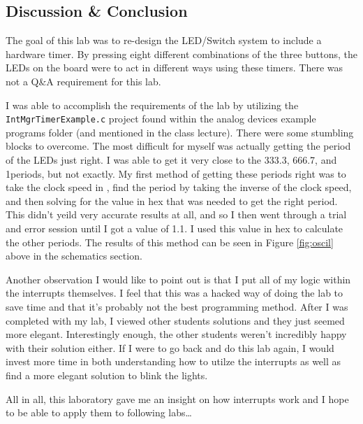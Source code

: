 \begin{CJK}
\newpage
\section{Discussion \& Conclusion}
The goal of this lab was to re-design the LED/Switch system to include a hardware timer.  By pressing eight different combinations of the three buttons, the LEDs on the board were to act in different ways using these timers. There was not a Q\&A requirement for this lab. \vspace{3mm} %

I was able to accomplish the requirements of the lab by utilizing the \texttt{IntMgrTimerExample.c} project found within the analog devices example programs folder (and mentioned in the class lecture).  There were some stumbling blocks to overcome.  The most difficult for myself was actually getting the period of the LEDs just right.  I was able to get it very close to the 333.3\ms, 666.7\ms, and 1\s periods, but not exactly.  My first method of getting these periods right was to take the clock speed in \MHz, find the period by taking the inverse of the clock speed, and then solving for the value in hex that was needed to get the right period.  This didn't yeild very accurate results at all, and so I then went through a trial and error session until I got a value of 1.1\ms.  I used this value in hex to calculate the other periods.  The results of this method can be seen in Figure \ref{fig:oscil} above in the schematics section. \vspace{3mm}

Another observation I would like to point out is that I put all of my logic within the interrupts themselves.  I feel that this was a hacked way of doing the lab to save time and that it's probably not the best programming method.  After I was completed with my lab, I viewed other students solutions and they just seemed more elegant.  Interestingly enough, the other students weren't incredibly happy with their solution either.  If I were to go back and do this lab again, I would invest more time in both understanding how to utilze the interrupts as well as find a more elegant solution to blink the lights. \vspace{3mm}

All in all, this laboratory gave me an insight on how interrupts work and I hope to be able to apply them to following labs\ldots


\end{CJK}

